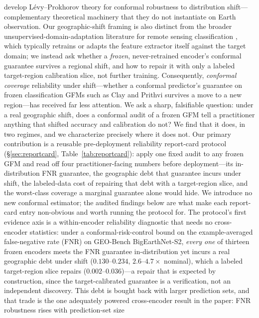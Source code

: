 \documentclass[11pt]{article}
\begin{document}
\citet{aolaritei2025levyprokhorov} develop L\'evy--Prokhorov theory for conformal robustness to distribution
shift---complementary theoretical machinery that they do not instantiate on Earth observation.
Our geographic-shift framing is also distinct from the broader unsupervised-domain-adaptation literature for
remote sensing classification \citep{tuia2016domain,zhu2017deep}, which typically retrains or adapts the
feature extractor itself against the target domain; we instead ask whether a \emph{frozen}, never-retrained
encoder's conformal guarantee survives a regional shift, and how to repair it with only a labeled
target-region calibration slice, not further training.
Consequently, \emph{conformal coverage} reliability
under shift---whether a conformal predictor's guarantee \citep{vovk2005algorithmic,angelopoulos2023conformal} on frozen classification GFMs
such as Clay and Prithvi survives a move to a new
region---has received far less attention. We ask a sharp, falsifiable question: under a real geographic
shift, does a conformal audit of a frozen GFM tell a practitioner anything that shifted accuracy
and calibration do not? We find that it does, in two regimes, and we characterize precisely where it
does not. Our primary contribution is a reusable pre-deployment reliability report-card protocol
(\S\ref{sec:reportcard}, Table~\ref{tab:reportcard}): apply one fixed audit to any frozen GFM and read
off four practitioner-facing numbers before deployment---its in-distribution FNR guarantee, the
geographic debt that guarantee incurs under shift, the labeled-data cost of repairing that debt with a
target-region slice, and the worst-class coverage a marginal guarantee alone would hide. We introduce no
new conformal estimator; the audited findings below are what make each report-card entry non-obvious and
worth running the protocol for. The protocol's first evidence axis is a within-encoder reliability
diagnostic that needs no cross-encoder
statistics: under a conformal-risk-control \citep{angelopoulos2024crc} bound on the example-averaged
false-negative rate (FNR) on GEO-Bench BigEarthNet-S2, \emph{every one} of thirteen frozen encoders meets
the FNR guarantee in-distribution yet incurs a real geographic debt under shift ($0.130$--$0.234$,
$2.6$--$4.7\times$ nominal), which a labeled target-region slice repairs ($0.002$--$0.036$)---a repair
that is expected by construction, since the target-calibrated guarantee is a verification, not an
independent discovery. This debt is bought back with larger prediction sets, and that trade is the one
adequately powered cross-encoder result in the paper: FNR robustness rises with prediction-set size
\end{document}
